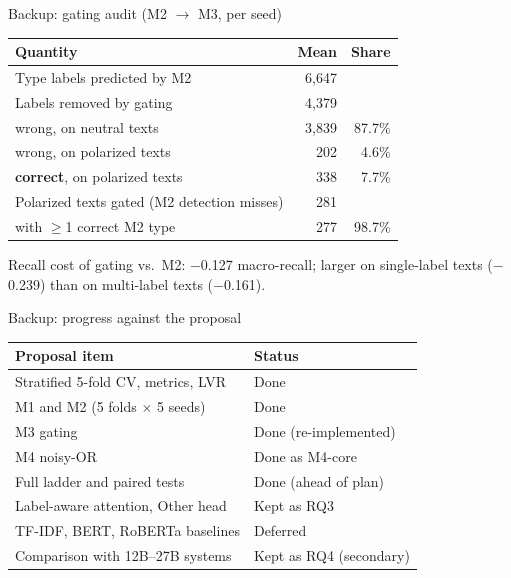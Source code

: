 \begin{frame}{Backup: gating audit (M2 $\rightarrow$ M3, per seed)}
\centering\small
\begin{tabular}{@{}lrr@{}}
\toprule
Quantity & Mean & Share \\
\midrule
Type labels predicted by M2 & 6{,}647 & \\
Labels removed by gating & 4{,}379 & \\
\quad wrong, on neutral texts & 3{,}839 & 87.7\% \\
\quad wrong, on polarized texts & 202 & 4.6\% \\
\quad \textbf{correct}, on polarized texts & 338 & 7.7\% \\
Polarized texts gated (M2 detection misses) & 281 & \\
\quad with $\geq$1 correct M2 type & 277 & 98.7\% \\
\bottomrule
\end{tabular}

\vspace{6pt}
\raggedright\small
Recall cost of gating vs.\ M2: $-$0.127 macro-recall; larger on single-label texts
($-$0.239) than on multi-label texts ($-$0.161).
\end{frame}

\begin{frame}{Backup: progress against the proposal}
\centering\small
\begin{tabular}{@{}ll@{}}
\toprule
Proposal item & Status \\
\midrule
Stratified 5-fold CV, metrics, LVR & Done \\
M1 and M2 (5 folds $\times$ 5 seeds) & Done \\
M3 gating & Done (re-implemented) \\
M4 noisy-OR & Done as M4-core \\
Full ladder and paired tests & Done (ahead of plan) \\
Label-aware attention, Other head & Kept as RQ3 \\
TF-IDF, BERT, RoBERTa baselines & Deferred \\
Comparison with 12B--27B systems & Kept as RQ4 (secondary) \\
\bottomrule
\end{tabular}
\end{frame}


